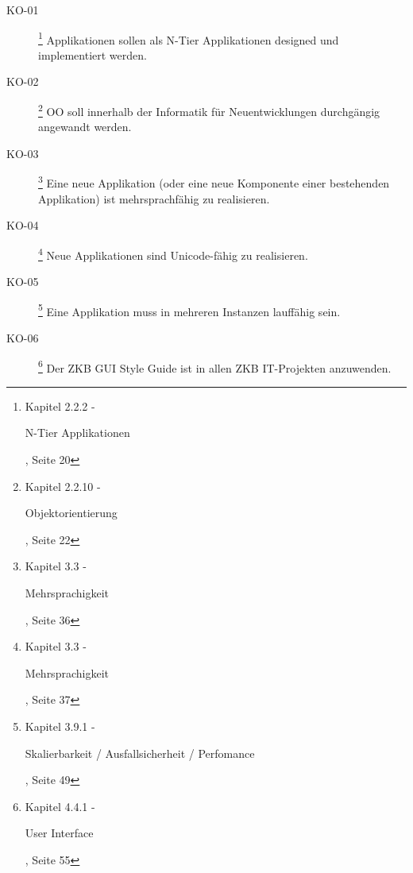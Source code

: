   \begin{description}

    \item[KO-01\label{itm:KO-01}]
    \footnote{\cite{ZkbHandbuchDerItArchitektur} Kapitel 2.2.2 -
    \begin{itshape}N-Tier Applikationen\end{itshape}, Seite 20}
    Applikationen sollen als N-Tier Applikationen designed und
    implementiert werden.

    \item[KO-02\label{itm:KO-02}]
    \footnote{\cite{ZkbHandbuchDerItArchitektur} Kapitel 2.2.10 -
    \begin{itshape}Objektorientierung\end{itshape}, Seite 22}
    \ac{OO} soll innerhalb der Informatik für Neuentwicklungen
    durchgängig angewandt werden.

    \item[KO-03\label{itm:KO-03}]
    \footnote{\cite{ZkbHandbuchDerItArchitektur} Kapitel 3.3 -
    \begin{itshape}Mehrsprachigkeit\end{itshape}, Seite 36}
    Eine neue Applikation (oder eine neue Komponente einer
    bestehenden Applikation) ist mehrsprachfähig zu realisieren.

    \item[KO-04\label{itm:KO-04}]
    \footnote{\cite{ZkbHandbuchDerItArchitektur} Kapitel 3.3 -
    \begin{itshape}Mehrsprachigkeit\end{itshape}, Seite 37}
    Neue Applikationen sind Unicode-fähig zu realisieren.

    \item[KO-05\label{itm:KO-05}]
    \footnote{\cite{ZkbHandbuchDerItArchitektur} Kapitel 3.9.1 -
    \begin{itshape}Skalierbarkeit / Ausfallsicherheit / Perfomance\end{itshape},
    Seite 49}
    Eine Applikation muss in mehreren Instanzen lauffähig sein.

    \item[KO-06\label{itm:KO-06}]
    \footnote{\cite{ZkbHandbuchDerItArchitektur} Kapitel 4.4.1 -
    \begin{itshape}User Interface\end{itshape}, Seite 55}
    Der ZKB GUI Style Guide ist in allen ZKB IT-Projekten anzuwenden.
    

\end{description}

